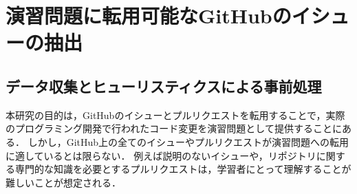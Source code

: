 \def\vector#1{\mbox{\boldmath $#1$}}

\chapter[演習問題に転用可能なGitHubのイシューの抽出]{演習問題に転用可能なGitHubのイシューの抽出}
\graphicspath{{Chapter3/Figs/}}

\label{section:issue-classification}

\section{データ収集とヒューリスティクスによる事前処理}

本研究の目的は，GitHubのイシューとプルリクエストを転用することで，実際のプログラミング開発で行われたコード変更を演習問題として提供することにある．
しかし，GitHub上の全てのイシューやプルリクエストが演習問題への転用に適しているとは限らない．
例えば説明のないイシューや，リポジトリに関する専門的な知識を必要とするプルリクエストは，学習者にとって理解することが難しいことが想定される．

